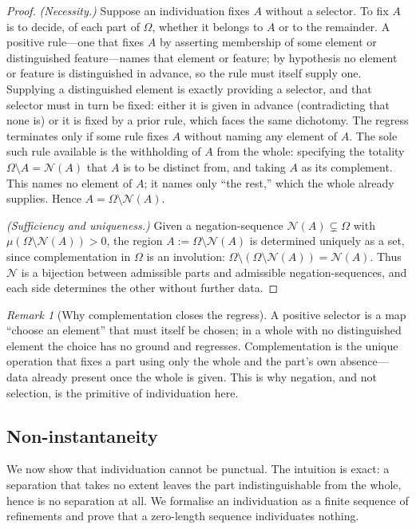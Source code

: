 \documentclass[11pt,twocolumn,a4paper]{article}
\theoremstyle{thmstyle}
\theoremstyle{definition}
\theoremstyle{remark}
\newtheorem{remark}[theorem]{Remark}
\newcommand{\Space}{\Omega}
\newcommand{\Neg}{\mathcal{N}}
\begin{document}
\begin{proof}
\emph{(Necessity.)} Suppose an individuation fixes $A$ without a selector. To
fix $A$ is to decide, of each part of $\Space$, whether it belongs to $A$ or to
the remainder. A positive rule---one that fixes $A$ by asserting membership of
some element or distinguished feature---names that element or feature; by
hypothesis no element or feature is distinguished in advance, so the rule must
itself supply one. Supplying a distinguished element is exactly providing a
selector, and that selector must in turn be fixed: either it is given in advance
(contradicting that none is) or it is fixed by a prior rule, which faces the same
dichotomy. The regress terminates only if some rule fixes $A$ without naming any
element of $A$. The sole such rule available is the withholding of $A$ from the
whole: specifying the totality $\Space\setminus A=\Neg(A)$ that $A$ is to be
distinct from, and taking $A$ as its complement. This names no element of $A$;
it names only ``the rest,'' which the whole already supplies. Hence
$A=\Space\setminus\Neg(A)$.

\emph{(Sufficiency and uniqueness.)} Given a negation-sequence
$\Neg(A)\subsetneq\Space$ with $\mu(\Space\setminus\Neg(A))>0$, the region
$A:=\Space\setminus\Neg(A)$ is determined uniquely as a set, since complementation
in $\Space$ is an involution: $\Space\setminus(\Space\setminus\Neg(A))=\Neg(A)$.
Thus $\Neg$ is a bijection between admissible parts and admissible
negation-sequences, and each side determines the other without further data.
\end{proof}

\begin{remark}[Why complementation closes the regress]
\label{rem:regress}
A positive selector is a map ``choose an element'' that must itself be chosen; in
a whole with no distinguished element the choice has no ground and regresses.
Complementation is the unique operation that fixes a part using only the whole
and the part's own absence---data already present once the whole is given. This
is why negation, and not selection, is the primitive of individuation here.
\end{remark}

\subsection{Non-instantaneity}

We now show that individuation cannot be punctual. The intuition is exact: a
separation that takes no extent leaves the part indistinguishable from the
whole, hence is no separation at all. We formalise an individuation as a finite
sequence of refinements and prove that a zero-length sequence individuates
nothing.
\end{document}
